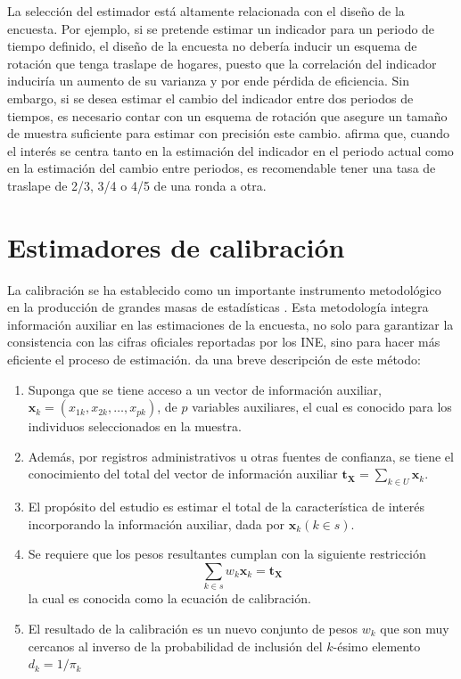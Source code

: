 \documentclass[
  12pt,
  spanish,
]{book}
\providecommand{\tightlist}{%
  \setlength{\itemsep}{0pt}\setlength{\parskip}{0pt}}
\begin{document}
La selección del estimador está altamente relacionada con el diseño de la encuesta. Por ejemplo, si se pretende estimar un indicador para un periodo de tiempo definido, el diseño de la encuesta no debería inducir un esquema de rotación que tenga traslape de hogares, puesto que la correlación del indicador induciría un aumento de su varianza y por ende pérdida de eficiencia. Sin embargo, si se desea estimar el cambio del indicador entre dos periodos de tiempos, es necesario contar con un esquema de rotación que asegure un tamaño de muestra suficiente para estimar con precisión este cambio. \citet[sección 12.13]{Cochran_1977} afirma que, cuando el interés se centra tanto en la estimación del indicador en el periodo actual como en la estimación del cambio entre periodos, es recomendable tener una tasa de traslape de 2/3, 3/4 o 4/5 de una ronda a otra.

\hypertarget{estimadores-de-calibraciuxf3n}{%
\section{Estimadores de calibración}\label{estimadores-de-calibraciuxf3n}}

La calibración se ha establecido como un importante instrumento metodológico en la producción de grandes masas de estadísticas \citep{Sar08}. Esta metodología integra información auxiliar en las estimaciones de la encuesta, no solo para garantizar la consistencia con las cifras oficiales reportadas por los INE, sino para hacer más eficiente el proceso de estimación. \citet{Gutierrez_2016} da una breve descripción de este método:

\begin{enumerate}
\def\labelenumi{\arabic{enumi}.}
\tightlist
\item
  Suponga que se tiene acceso a un vector de información auxiliar, \(\mathbf{x}_k=(x_{1k}, x_{2k},\ldots,x_{pk})\), de \(p\) variables auxiliares, el cual es conocido para los individuos seleccionados en la muestra.
\item
  Además, por registros administrativos u otras fuentes de confianza, se tiene el conocimiento del total del vector de información auxiliar \(\mathbf{t_X}=\sum_{k\in U}\mathbf{x}_k\).
\item
  El propósito del estudio es estimar el total de la característica de interés incorporando la información auxiliar, dada por \(\mathbf{x}_k (k\in s)\).
\item
  Se requiere que los pesos resultantes cumplan con la siguiente restricción
  \[
    \sum_{k\in s}w_k\mathbf{x}_k = \mathbf{t_X}
  \]
  la cual es conocida como la ecuación de calibración.
\item
  El resultado de la calibración es un nuevo conjunto de pesos \(w_k\) que son muy cercanos al inverso de la probabilidad de inclusión del \(k\)-ésimo elemento \(d_k=1/\pi_k\)
\end{enumerate}
\end{document}
